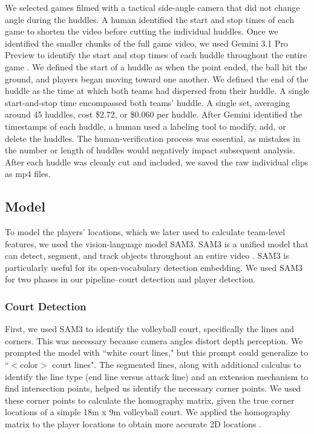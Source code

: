 \documentclass[12pt]{article}          %
\begin{document}
We selected games filmed with a tactical side-angle camera that did not change angle during the huddles. A human identified the start and stop times of each game to shorten the video before cutting the individual huddles. Once we identified the smaller chunks of the full game video, we used Gemini 3.1 Pro Preview to identify the start and stop times of each huddle throughout the entire game \citep{gemini31pro2026}. We defined the start of a huddle as when the point ended, the ball hit the ground, and players began moving toward one another. We defined the end of the huddle as the time at which both teams had dispersed from their huddle. A single start-and-stop time encompassed both teams' huddle. A single set, averaging around 45 huddles, cost \$2.72, or \$0.060 per huddle. After Gemini identified the timestamps of each huddle, a human used a labeling tool to modify, add, or delete the huddles. The human-verification process was essential, as mistakes in the number or length of huddles would negatively impact subsequent analysis. After each huddle was cleanly cut and included, we saved the raw individual clips as mp4 files. 


\subsection{Model}
To model the players' locations, which we later used to calculate team-level features, we used the vision-language model SAM3. SAM3 is a unified model that can detect, segment, and track objects throughout an entire video \citep{sam3_2025}. SAM3 is particularly useful for its open-vocabulary detection embedding. We used SAM3 for two phases in our pipeline–court detection and player detection.

\subsubsection{Court Detection}
First, we used SAM3 to identify the volleyball court, specifically the lines and corners. This was necessary because camera angles distort depth perception. We prompted the model with ``white court lines," but this prompt could generalize to ``$<$color$>$ court lines". The segmented lines, along with additional calculus to identify the line type (end line versus attack line) and an extension mechanism to find intersection points, helped us identify the necessary corner points. We used these corner points to calculate the homography matrix, given the true corner locations of a simple 18m x 9m volleyball court. We applied the homography matrix to the player locations to obtain more accurate 2D locations \citep{hartley2004multiple}. 
\end{document}
